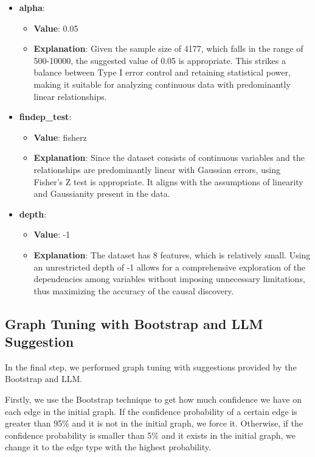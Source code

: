\documentclass{article}
\begin{document}
\begin{itemize}

\item \textbf{alpha}:
\begin{itemize}
    \item \textbf{Value}: 0.05
    \item \textbf{Explanation}: Given the sample size of 4177, which falls in the range of 500-10000, the suggested value of 0.05 is appropriate. This strikes a balance between Type I error control and retaining statistical power, making it suitable for analyzing continuous data with predominantly linear relationships.
\end{itemize}

\item \textbf{findep\_test}:
\begin{itemize}
    \item \textbf{Value}: fisherz
    \item \textbf{Explanation}: Since the dataset consists of continuous variables and the relationships are predominantly linear with Gaussian errors, using Fisher's Z test is appropriate. It aligns with the assumptions of linearity and Gaussianity present in the data.
\end{itemize}

\item \textbf{depth}:
\begin{itemize}
    \item \textbf{Value}: -1
    \item \textbf{Explanation}: The dataset has 8 features, which is relatively small. Using an unrestricted depth of -1 allows for a comprehensive exploration of the dependencies among variables without imposing unnecessary limitations, thus maximizing the accuracy of the causal discovery.
\end{itemize}

\end{itemize}

\subsection{Graph Tuning with Bootstrap and LLM Suggestion}
In the final step, we performed graph tuning with suggestions provided by the Bootstrap and LLM.
            
Firstly, we use the Bootstrap technique to get how much confidence we have on each edge in the initial graph.
If the confidence probability of a certain edge is greater than 95\% and it is not in the initial graph, we force it.
Otherwise, if the confidence probability is smaller than 5\% and it exists in the initial graph, we change it to the edge type with the highest probability.
            
\end{document}
